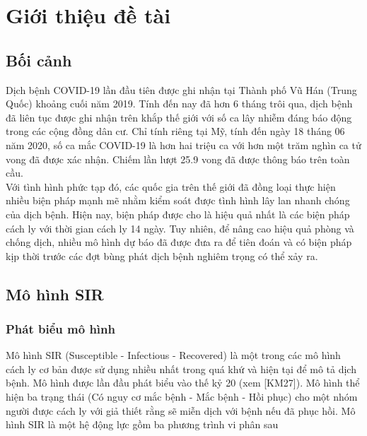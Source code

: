 \documentclass[a4paper]{article}
\begin{document}

\newpage
\tableofcontents
\newpage


\section{Giới thiệu đề tài}
\label{chuan_bi}
\subsection{Bối cảnh} 
\setlength{\parindent}{1cm}
\indent [0.2]Dịch bệnh COVID-19 lần đầu tiên được ghi nhận tại Thành phố Vũ Hán (Trung Quốc) khoảng
cuối năm 2019. Tính đến nay đã hơn 6 tháng trôi qua, dịch bệnh đã liên tục được ghi nhận trên
khắp thế giới với số ca lây nhiễm đáng báo động trong các cộng đồng dân cư. Chỉ tính riêng tại
Mỹ, tính đến ngày 18 tháng 06 năm 2020, số ca mắc COVID-19 là hơn hai triệu ca với hơn một
trăm nghìn ca tử vong đã được xác nhận. Chiếm lần lượt 25.9%
vong đã được thông báo trên toàn cầu.
\\
\indent Với tình hình phức tạp đó, các quốc gia trên thế giới đã đồng loại thực hiện nhiều biện pháp
mạnh mẽ nhằm kiểm soát được tình hình lây lan nhanh chóng của dịch bệnh. Hiện nay, biện
pháp được cho là hiệu quả nhất là các biện pháp cách ly với thời gian cách ly 14 ngày. Tuy nhiên,
để nâng cao hiệu quả phòng và chống dịch, nhiều mô hình dự báo đã được đưa ra để tiên đoán
và có biện pháp kịp thời trước các đợt bùng phát dịch bệnh nghiêm trọng có thể xảy ra.
\subsection{Mô hình SIR}

\subsubsection{Phát biểu mô hình}
Mô hình SIR (Susceptible - Infectious - Recovered) là một trong các mô hình cách ly cơ bản được sử dụng nhiều nhất trong quá khứ và hiện tại để mô tả dịch bệnh. Mô hình được lần đầu
phát biểu vào thế kỷ 20 (xem [KM27]). Mô hình thể hiện ba trạng thái (Có nguy cơ mắc bệnh -
Mắc bệnh - Hồi phục) cho một nhóm người được cách ly với giả thiết rằng sẽ miễn dịch với bệnh
nếu đã phục hồi. Mô hình SIR là một hệ động lực gồm ba phương trình vi phân sau
\end{document}

